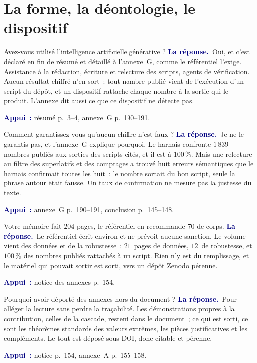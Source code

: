 \documentclass[11pt,a4paper]{article}
\newcommand{\rep}[1]{\smallskip\noindent\textcolor{navy}{\textbf{La réponse.}}\ #1\par}
\newcommand{\appui}[1]{\smallskip\noindent\small\textcolor{navy}{\textbf{Appui~:}} #1\par\normalsize}
\begin{document}
\section{La forme, la déontologie, le dispositif}

\begin{question}{\og Avez-vous utilisé l'intelligence artificielle générative ?\fg{}}
\rep{Oui, et c'est déclaré en fin de résumé et détaillé à l'annexe~G, comme le référentiel
l'exige. Assistance à la rédaction, écriture et relecture des scripts, agents de vérification.
Aucun résultat chiffré n'en sort~: tout nombre publié vient de l'exécution d'un script du dépôt,
et un dispositif rattache chaque nombre à la sortie qui le produit. L'annexe dit aussi ce que ce
dispositif ne détecte pas.}
\appui{résumé p.~3--4, annexe~G p.~190--191.}
\end{question}

\begin{question}{\og Comment garantissez-vous qu'aucun chiffre n'est faux ?\fg{}}
\rep{Je ne le garantis pas, et l'annexe~G explique pourquoi. Le harnais confronte $1\,839$
nombres publiés aux sorties des scripts cités, et il est à $100\,\%$. Mais une relecture au filtre
des superlatifs et des comptages a trouvé huit erreurs sémantiques que le harnais confirmait
toutes les huit~: le nombre sortait du bon script, seule la phrase autour était fausse. Un taux de
confirmation ne mesure pas la justesse du texte.}
\appui{annexe~G p.~190--191, conclusion p.~145--148.}
\end{question}

\begin{question}{\og Votre mémoire fait $204$ pages, le référentiel en recommande $70$ de corps.\fg{}}
\rep{Le référentiel écrit \og environ\fg{} et ne prévoit aucune sanction. Le volume vient des données
et de la robustesse~: $21$~pages de données, $12$~de robustesse, et $100\,\%$ des nombres publiés
rattachés à un script. Rien n'y est du remplissage, et le matériel qui pouvait sortir est sorti,
vers un dépôt Zenodo pérenne.}
\appui{notice des annexes p.~154.}
\end{question}

\begin{question}{\og Pourquoi avoir déporté des annexes hors du document ?\fg{}}
\rep{Pour alléger la lecture sans perdre la traçabilité. Les démonstrations propres à la
contribution, celles de la cascade, restent dans le document~; ce qui est sorti, ce sont les
théorèmes standards des valeurs extrêmes, les pièces justificatives et les compléments. Le tout
est déposé sous DOI, donc citable et pérenne.}
\appui{notice p.~154, annexe~A p.~155--158.}
\end{question}
\end{document}
